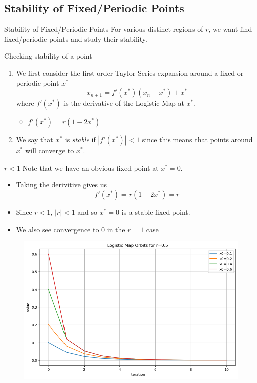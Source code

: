\documentclass[
	11pt, %
]{beamer}
\begin{document}
\subsection{Stability of Fixed/Periodic Points}
\begin{frame}{Stability of Fixed/Periodic Points}
For various distinct regions of $r$, we want find fixed/periodic points and study their stability.
\begin{block}{Checking stability of a point}
\begin{enumerate}
    \item
    We first consider the first order Taylor Series expansion around a fixed or periodic point $x^\ast$
    \[x_{n+1}=f'(x^\ast)(x_n-x^\ast)+x^\ast\]
    where $f'(x^\ast)$ is the derivative of the Logistic Map at $x^\ast$.
    \begin{itemize}
        \item $f'(x^\ast)=r(1-2x^\ast)$
    \end{itemize}
    \item
        We say that $x^\ast$ is \emph{stable} if $|f'(x^\ast)|<1$ since this means that points around $x^\ast$ will converge to $x^\ast$.
\end{enumerate}
    
\end{block}
\end{frame}
\begin{frame}{$r<1$}
Note that we have an obvious fixed point at $x^\ast=0$.
\begin{itemize}
    \item Taking the derivitive gives us 
    \[f'(x^\ast)=r(1-2x^\ast)=r\]
    \item
    Since $r<1$, $|r|<1$ and so $x^\ast=0$ is a stable fixed point.
    \item
	    We also see convergence to $0$ in the $r=1$ case
\end{itemize}
 	\begin{figure}
	\includegraphics[scale=0.3]{./figures/rles1}
	\end{figure}
\end{frame}
\end{document}

